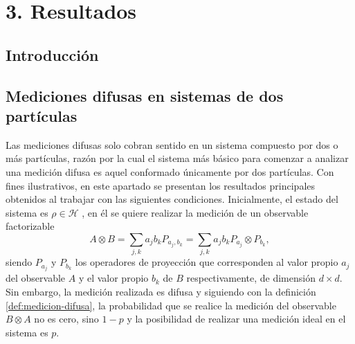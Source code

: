 \chapter[RESULTADOS]{3. Resultados}
\section{Introducción} %


\section{Mediciones difusas en sistemas de dos partículas} %


Las mediciones difusas solo cobran sentido en un sistema compuesto por dos o
más partículas, razón por la cual el sistema más básico para comenzar a
analizar una medición difusa es aquel conformado únicamente por dos partículas.
Con fines ilustrativos, en este apartado se presentan los resultados principales obtenidos al trabajar con las siguientes condiciones. Inicialmente, el estado del sistema es $\rho  \in \mathcal{H}$ ,  en él  se quiere realizar la medición de un observable factorizable 
\[A\otimes B=\sum_{j,k}a_j
b_k P_{a_j, b_k}=\sum_{j,k}a_j b_k P_{a_j}\otimes P_{b_k},\] siendo $P_{a_j}$ y
$P_{b_k}$ los operadores de proyección que corresponden al valor propio $a_j$
del observable $A$ y el valor propio $b_k$ de $B$ respectivamente, de dimensión $d\times d$. Sin embargo, la medición realizada es difusa y siguiendo con la
definición {\ref{def:medicion-difusa}}, la probabilidad que se realice la
medición del observable $B\otimes A$ no es cero, sino $1-p$ y la posibilidad de
realizar una medición ideal en el sistema  es $p$. 

